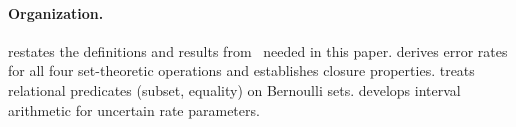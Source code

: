 \paragraph{Organization.}
 restates the definitions and results from~\cite{bernoulliSets} needed in this paper.
 derives error rates for all four set-theoretic operations and establishes closure properties.
 treats relational predicates (subset, equality) on Bernoulli sets.
 develops interval arithmetic for uncertain rate parameters.
